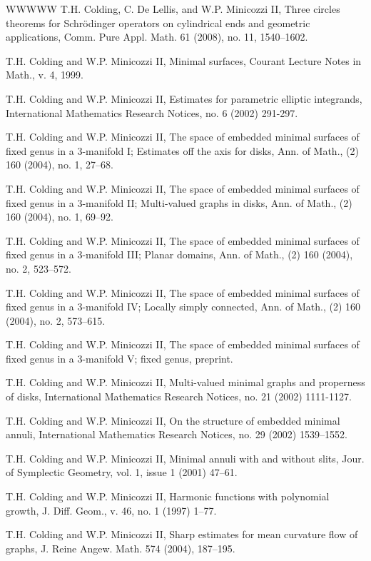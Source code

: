 \begin{thebibliography}{WWWWW}
 T.H. Colding, C. De Lellis, and W.P. Minicozzi II, Three circles theorems for Schrödinger operators on cylindrical ends and geometric applications, Comm. Pure Appl. Math. 61 (2008), no. 11, 1540–1602.

 T.H. Colding and W.P. Minicozzi II, Minimal surfaces, Courant Lecture Notes in Math., v. 4, 1999.

 T.H. Colding and W.P. Minicozzi II, Estimates for parametric elliptic integrands, International Mathematics Research Notices, no. 6 (2002) 291-297.

 T.H. Colding and W.P. Minicozzi II, The space of embedded minimal surfaces of fixed genus in a 3-manifold I; Estimates off the axis for disks, Ann. of Math., (2) 160 (2004), no. 1, 27–68.

 T.H. Colding and W.P. Minicozzi II, The space of embedded minimal surfaces of fixed genus in a 3-manifold II; Multi-valued graphs in disks, Ann. of Math., (2) 160 (2004), no. 1, 69–92.

 T.H. Colding and W.P. Minicozzi II, The space of embedded minimal surfaces of fixed genus in a 3-manifold III; Planar domains, Ann. of Math., (2) 160 (2004), no. 2, 523–572.

 T.H. Colding and W.P. Minicozzi II, The space of embedded minimal surfaces of fixed genus in a 3-manifold IV; Locally simply connected, Ann. of Math., (2) 160 (2004), no. 2, 573–615.

 T.H. Colding and W.P. Minicozzi II, The space of embedded minimal surfaces of fixed genus in a 3-manifold V; fixed genus, preprint.

 T.H. Colding and W.P. Minicozzi II, Multi-valued minimal graphs and properness of disks, International Mathematics Research Notices, no. 21 (2002) 1111-1127.

 T.H. Colding and W.P. Minicozzi II, On the structure of embedded minimal annuli, International Mathematics Research Notices, no. 29 (2002) 1539–1552.

 T.H. Colding and W.P. Minicozzi II, Minimal annuli with and without slits, Jour. of Symplectic Geometry, vol. 1, issue 1 (2001) 47–61.

 T.H. Colding and W.P. Minicozzi II, Harmonic functions with polynomial growth, J. Diff. Geom., v. 46, no. 1 (1997) 1–77.

 T.H. Colding and W.P. Minicozzi II, Sharp estimates for mean curvature flow of graphs, J. Reine Angew. Math. 574 (2004), 187–195.


\end{thebibliography}
